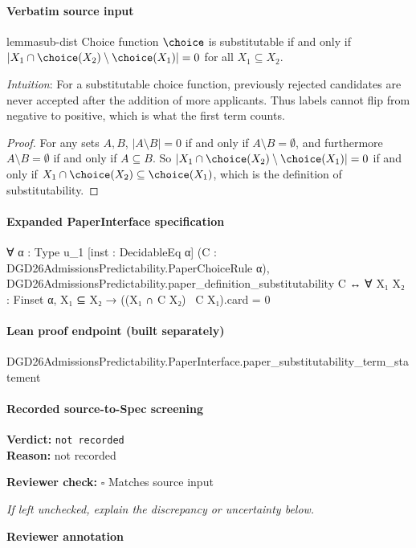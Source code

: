 \documentclass[10pt]{article}
\newcommand{\reviewerbox}{%
  \par\noindent\fbox{\parbox{0.96\linewidth}{\rule{0pt}{0.38in}}}\par
}
\newcommand{\reviewmatch}[1]{%
  \par\noindent\textbf{Reviewer check:} $\square$\; #1\par
  \noindent\emph{If left unchecked, explain the discrepancy or uncertainty below.}\par
}
\begin{document}
\paragraph{Verbatim source input}
\begin{ReviewVerbatim}
\begin{restatable}{lemma}{sub-dist}
\label{lem:substitutability-term}
Choice function $\choice$ is substitutable if and only if $|X_1 \cap \choice(X_2) \setminus \choice(X_1)| = 0$ for all $X_1 \subseteq X_2$.
\end{restatable}

\textit{Intuition}:
For a substitutable choice function, previously rejected candidates are never accepted after the addition of more applicants. Thus labels cannot flip from negative to positive, which is what the first term counts.

\begin{proof}
For any sets $A, B$, $|A \setminus B| = 0$ if and only if $A \setminus B = \emptyset$, and furthermore $A \setminus B = \emptyset$ if and only if $A \subseteq B$. So $|X_1 \cap \choice(X_2) \setminus \choice(X_1)| = 0$ if and only if $X_1 \cap \choice(X_2) \subseteq \choice(X_1)$, which is the definition of substitutability.
\end{proof}
\end{ReviewVerbatim}


\paragraph{Expanded PaperInterface specification}
\begin{ReviewVerbatim}
∀ {α : Type u_1} [inst : DecidableEq α] (C : DGD26AdmissionsPredictability.PaperChoiceRule α),
  DGD26AdmissionsPredictability.paper_definition_substitutability C ↔
    ∀ {X₁ X₂ : Finset α}, X₁ ⊆ X₂ → ((X₁ ∩ C X₂) \ C X₁).card = 0
\end{ReviewVerbatim}

\paragraph{Lean proof endpoint (built separately)}\begin{ReviewVerbatim}
DGD26AdmissionsPredictability.PaperInterface.paper_substitutability_term_statement
\end{ReviewVerbatim}

\paragraph{Recorded source-to-Spec screening}
\textbf{Verdict:} \texttt{not recorded}
\\
\textbf{Reason:} not recorded
\reviewmatch{Matches source input}
\noindent\textbf{Reviewer annotation}\par
\reviewerbox
\clearpage
\hypertarget{source-claim-ca2a099855204aca}{}
\end{document}
